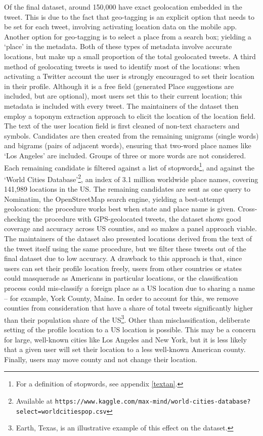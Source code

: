 \documentclass[12pt,a4]{article}
\begin{document}
Of the final dataset, around 150,000 have exact geolocation embedded in the tweet. This is due to the fact that geo-tagging is an explicit option that needs to be set for each tweet, involving activating location data on the mobile app. Another option for geo-tagging is to select a place from a search box; yielding a `place' in the metadata. Both of these types of metadata involve accurate locations, but make up a small proportion of the total geolocated tweets. A third method of geolocating tweets is used to identify most of the locations: when activating a Twitter account the user is strongly encouraged to set their location in their profile. Although it is a free field (generated Place suggestions are included, but are optional), most users set this to their current location; this metadata is included with every tweet. The maintainers of the dataset then employ a toponym extraction approach to elicit the location of the location field. The text of the user location field is first cleaned of non-text characters and symbols. Candidates are then created from the remaining unigrams (single words) and bigrams (pairs of adjacent words), ensuring that two-word place names like `Los Angeles' are included. Groups of three or more words are not considered. Each remaining candidate is filtered against a list of stopwords\footnote{For a definition of stopwords, see appendix \ref{textan}.}, and against the `World Cities Database'\footnote{Available at \texttt{https://www.kaggle.com/max-mind/world-cities-database?select=worldcitiespop.csv}}, an index of 3.1 million worldwide place names, covering 141,989 locations in the US. The remaining candidates are sent as one query to Nominatim, the OpenStreetMap search engine, yielding a best-attempt geolocation: the procedure works best when state and place name is given. Cross-checking the procedure with GPS-geolocated tweets, the dataset shows good coverage and accuracy across US counties, and so makes a panel approach viable. The maintainers of the dataset also presented locations derived from the text of the tweet itself using the same procedure, but we filter these tweets out of the final dataset due to low accuracy. A drawback to this approach is that, since users can set their profile location freely, users from other countries or states could masquerade as Americans in particular locations, or the classification process could mis-classify a foreign place as a US location due to sharing a name -- for example, York County, Maine. In order to account for this, we remove counties from consideration that have a share of total tweets significantly higher than their population share of the US\footnote{Earth, Texas, is an illustrative example of this effect on the dataset.}. Other than misclassification, deliberate setting of the profile location to a US location is possible. This may be a concern for large, well-known cities like Los Angeles and New York, but it is less likely that a given user will set their location to a less well-known American county. Finally, users may move county and not change their location.
\end{document}
